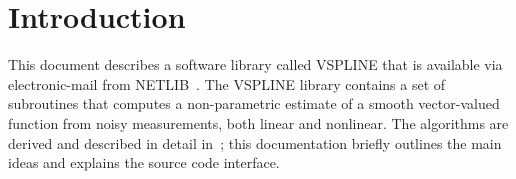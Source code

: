 
\section{Introduction}

This document describes
a software library called
VSPLINE
that is available via electronic-mail
from NETLIB~\cite{netlib:87}.
The VSPLINE library contains a set of subroutines
that computes a non-parametric estimate
of a smooth vector-valued function
from noisy measurements,
both linear and nonlinear.
The algorithms are derived and described
in detail in~\cite{Fessler:91:lin,Fessler:91:non};
this documentation briefly outlines the main ideas
and explains the source code interface.
